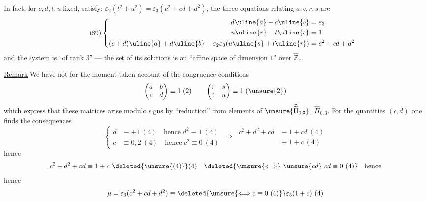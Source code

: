 In fact, for $c,d,t,u$ 
fixed, 
satisfy: $\varepsilon_2(t^2+u^2)=\varepsilon_3(c^2+cd+d^2)$,
the three equations relating $a,b,r,s$ are 
\[
\tag{89}
\left\{\begin{aligned}
d\uline{a}-c\uline{b}&=\varepsilon_3\\
u\uline{r}-t\uline{s}&=1\\
(c+d)\uline{a}+d\uline{b}
-\varepsilon_2\varepsilon_3(u\uline{s}+t\uline{r})&=c^2+cd+d^2
\end{aligned}\right.
\]
and the  system is ``of rank $3$''
--- the set of its solutions is an ``affine space of dimension $1$''
over $\widehat{\mathbb Z}$\ldots

\uline{Remark} We have not for the moment taken account of the congruence
conditions
\[
\begin{pmatrix}a&b\\c&d\end{pmatrix}\equiv1\ (2)
\qquad
\begin{pmatrix}r&s\\t&u\end{pmatrix}\equiv1\ (\unsure{2})
\]
which express that these matrices arise modulo signs by ``reduction''
from elements of
$\unsure{\widehat{\widetilde{\Pi}}_{0,3}}$, $\widehat{\Pi}_{0,3}$.
For the quantities $(c,d)$  one finds the
consequences
\[
\left\{\begin{aligned}
d&\equiv\pm1\ (4)\quad\text{hence }d^2\equiv1\ (4)\\
c&\equiv0,2\ (4)\quad\text{hence }c^2\equiv0\ (4)
\end{aligned}\right.
\ \Longrightarrow\
\begin{aligned}
c^2+d^2+cd&\equiv1+cd\ (4)\\
&\equiv1+c\ (4)
\end{aligned}
\]
hence
\[
c^2+d^2+cd\equiv1+c\ \deleted{\unsure{(4)}}(4)
\quad\deleted{\unsure{\Longleftrightarrow}\ \unsure{cd}\ cd\equiv0\ (4)}
\quad\text{hence}
\]
hence
\[
\mu=\varepsilon_3(c^2+cd+d^2)\equiv
\deleted{\unsure{\Longleftrightarrow c\equiv0\ (4)}}
\varepsilon_3(1+c)\ (4)
\]



